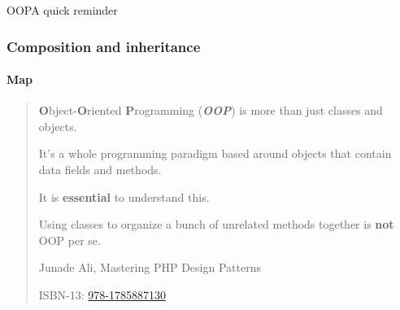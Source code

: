 \begin{sepframe}{OOP}{A quick reminder}
\end{sepframe}

\begin{frame}[fragile,c]
    \frametitle{Composition and inheritance}
    \framesubtitle{Map}

\end{frame}

\begin{frame}
    \begin{quote}
        \textbf{O}bject-\textbf{O}riented \textbf{P}rogramming (\textbf{\textit{OOP}}) is more than just classes and objects.\\\pause

        It's a whole programming paradigm based around objects that contain data fields and methods.\\

        \pause

        It is \textbf{essential} to understand this.\\

        \pause

        Using classes to organize a bunch of unrelated methods together is \textbf{not} OOP per se.\\

        \vspace{10 mm}

        \hfill Junade Ali, Mastering PHP Design Patterns

        \hfill ISBN-13: \href{https://www.amazon.com/Mastering-PHP-Design-Patterns-Junade/dp/1785887130}{978-1785887130}
    \end{quote}
\end{frame}

